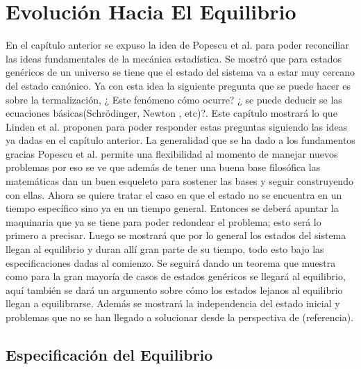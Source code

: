 \chapter{Evolución Hacia El Equilibrio}

En el capítulo anterior se expuso la idea de Popescu et al. \cite{Popescu2006} para poder reconciliar las ideas fundamentales de la mecánica estadística. Se mostró que para estados genéricos de un universo se tiene que el estado del sistema va a estar muy cercano del estado canónico. Ya con esta idea la siguiente pregunta que se puede hacer es sobre la termalización, ¿ Este fenómeno cómo ocurre? ¿ se puede deducir se las ecuaciones básicas(Schrödinger, Newton , etc)?. Este capítulo mostrará lo que Linden et al. \cite{LindenPaper} proponen para poder responder estas preguntas siguiendo las ideas ya dadas en el capítulo anterior. La generalidad que se ha dado a los fundamentos gracias Popescu et al. permite una flexibilidad al momento de manejar nuevos problemas por eso se ve que además de tener una buena base filosófica las matemáticas dan un buen esqueleto para sostener las bases y seguir construyendo con ellas. Ahora se quiere tratar el caso en que el estado no se encuentra en un tiempo específico sino ya en un tiempo  general. Entonces se deberá apuntar la maquinaria que ya se tiene para poder redondear el problema; esto será lo primero a  precisar. Luego se mostrará que por lo general los estados del sistema llegan al equilibrio y duran allí gran parte de su tiempo, todo esto bajo las especificaciones dadas al comienzo. Se seguirá dando un teorema que muestra como para la gran mayoría de casos de estados genéricos se llegará al equilibrio, aquí también se dará un argumento sobre cómo los estados lejanos al equilibrio  llegan a equilibrarse. Además se mostrará la independencia del estado inicial y problemas que no se han llegado a solucionar desde la perspectiva de (referencia).

\section{Especificación del Equilibrio}


